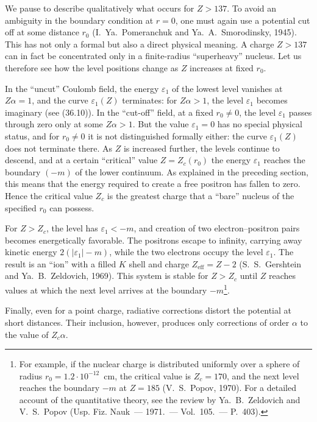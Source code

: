 We pause to describe qualitatively what occurs for $Z>137$. To avoid an ambiguity in the boundary condition at $r=0$, one must again use a potential cut off at some distance $r_0$ (I.~Ya.~Pomeranchuk and Ya.~A.~Smorodinsky, 1945). This has not only a formal but also a direct physical meaning. A charge $Z>137$ can in fact be concentrated only in a finite-radius ``superheavy'' nucleus. Let us therefore see how the level positions change as $Z$ increases at fixed $r_0$.

In the ``uncut'' Coulomb field, the energy $\varepsilon_1$ of the lowest level vanishes at $Z\alpha=1$, and the curve $\varepsilon_1(Z)$ terminates: for $Z\alpha>1$, the level $\varepsilon_1$ becomes imaginary (see (36.10)). In the ``cut-off'' field, at a fixed $r_0\ne0$, the level $\varepsilon_1$ passes through zero only at some $Z\alpha>1$. But the value $\varepsilon_1=0$ has no special physical status, and for $r_0\ne0$ it is not distinguished formally either: the curve $\varepsilon_1(Z)$ does not terminate there. As $Z$ is increased further, the levels continue to descend, and at a certain ``critical'' value $Z=Z_c(r_0)$ the energy $\varepsilon_1$ reaches the boundary $(-m)$ of the lower continuum. As explained in the preceding section, this means that the energy required to create a free positron has fallen to zero. Hence the critical value $Z_c$ is the greatest charge that a ``bare'' nucleus of the specified $r_0$ can possess.

For $Z>Z_c$, the level has $\varepsilon_1<-m$, and creation of two electron--positron pairs becomes energetically favorable. The positrons escape to infinity, carrying away kinetic energy $2(|\varepsilon_1|-m)$, while the two electrons occupy the level $\varepsilon_1$. The result is an ``ion'' with a filled $K$ shell and charge $Z_{\mathrm{eff}}=Z-2$ (S.~S.~Gershtein and Ya.~B.~Zeldovich, 1969). This system is stable for $Z>Z_c$ until $Z$ reaches values at which the next level arrives at the boundary $-m$\footnote{For example, if the nuclear charge is distributed uniformly over a sphere of radius $r_0=1.2\cdot10^{-12}$~cm, the critical value is $Z_c=170$, and the next level reaches the boundary $-m$ at $Z=185$ (V.~S.~Popov, 1970). For a detailed account of the quantitative theory, see the review by Ya.~B.~Zeldovich and V.~S.~Popov (Usp. Fiz. Nauk~--- 1971.~--- Vol.~105.~--- P.~403).}.

Finally, even for a point charge, radiative corrections distort the potential at short distances. Their inclusion, however, produces only corrections of order $\alpha$ to the value of $Z_c\alpha$.

